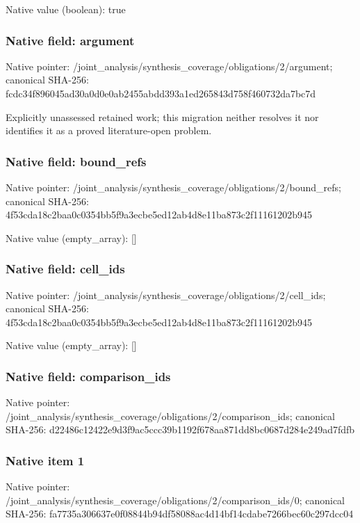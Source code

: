 \documentclass[10pt,a4paper]{article}
\begin{document}
Native value (boolean): true

\subsubsection{Native field: argument}
Native pointer: /joint\_\allowbreak{}analysis/synthesis\_\allowbreak{}coverage/obligations/2/argument; canonical SHA-256: fcdc34f896045ad30a0d0e0ab2455abdd393a1ed265843d758f460732da7bc7d

\begingroup\raggedright\sloppy Explicitly unassessed retained work;\allowbreak{} this migration neither resolves it nor identifies it as a proved literature-open problem.\par\endgroup

\subsubsection{Native field: bound\_\allowbreak{}refs}
Native pointer: /joint\_\allowbreak{}analysis/synthesis\_\allowbreak{}coverage/obligations/2/bound\_\allowbreak{}refs; canonical SHA-256: 4f53cda18c2baa0c0354bb5f9a3ecbe5ed12ab4d8e11ba873c2f11161202b945

Native value (empty\_\allowbreak{}array): []

\subsubsection{Native field: cell\_\allowbreak{}ids}
Native pointer: /joint\_\allowbreak{}analysis/synthesis\_\allowbreak{}coverage/obligations/2/cell\_\allowbreak{}ids; canonical SHA-256: 4f53cda18c2baa0c0354bb5f9a3ecbe5ed12ab4d8e11ba873c2f11161202b945

Native value (empty\_\allowbreak{}array): []

\subsubsection{Native field: comparison\_\allowbreak{}ids}
Native pointer: /joint\_\allowbreak{}analysis/synthesis\_\allowbreak{}coverage/obligations/2/comparison\_\allowbreak{}ids; canonical SHA-256: d22486c12422e9d3f9ac5ccc39b1192f678aa871dd8bc0687d284e249ad7fdfb

\subsubsection{Native item 1}
Native pointer: /joint\_\allowbreak{}analysis/synthesis\_\allowbreak{}coverage/obligations/2/comparison\_\allowbreak{}ids/0; canonical SHA-256: fa7735a306637e0f08844b94df58088ac4d14bf14cdabe7266bec60c297dcc04
\end{document}
